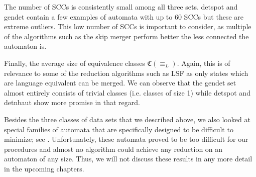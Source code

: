 The number of SCCs is consistently small among all three sets. detspot and gendet contain a few examples of automata with up to 60 SCCs but these are extreme outliers. This low number of SCCs is important to consider, as multiple of the algorithms such as the skip merger perform better the less connected the automaton is.

Finally, the average size of equivalence classes $\mathfrak{C}(\equiv_L)$. Again, this is of relevance to some of the reduction algorithms such as LSF as only states which are language equivalent can be merged. We can observe that the gendet set almost entirely consists of trivial classes (i.e. classes of size 1) while detspot and detnbaut show more promise in that regard.

\vspace{5pt}

Besides the three classes of data sets that we described above, we also looked at special families of automata that are specifically designed to be difficult to minimize; see \cite{Michel1988}. Unfortunately, these automata proved to be too difficult for our procedures and almost no algorithm could achieve any reduction on an automaton of any size. Thus, we will not discuss these results in any more detail in the upcoming chapters.

